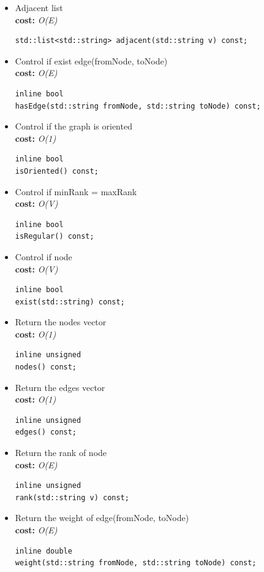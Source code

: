 \documentclass[10pt,a4paper]{article}
\begin{document}
\begin{itemize}
\item Adjacent list\\
\textbf{cost:} \emph{O(E)}
\begin{lstlisting}
std::list<std::string> adjacent(std::string v) const;
\end{lstlisting}

\item Control if exist edge(fromNode, toNode)\\
\textbf{cost:} \emph{O(E)}
\begin{lstlisting}
inline bool 
hasEdge(std::string fromNode, std::string toNode) const;
\end{lstlisting}

\item Control if the graph is oriented\\
\textbf{cost:} \emph{O(1)}
\begin{lstlisting}
inline bool 
isOriented() const;
\end{lstlisting}
   
\item Control if minRank = maxRank\\
\textbf{cost:} \emph{O(V)}
\begin{lstlisting}
inline bool 
isRegular() const; 
\end{lstlisting}
       
\item Control if node\\
\textbf{cost:} \emph{O(V)}
\begin{lstlisting}
inline bool 
exist(std::string) const;
\end{lstlisting} 
    
\item Return the nodes vector\\
\textbf{cost:} \emph{O(1)}
\begin{lstlisting}
inline unsigned 
nodes() const;
\end{lstlisting} 
  
\item Return the edges vector\\
\textbf{cost:} \emph{O(1)}
\begin{lstlisting}
inline unsigned 
edges() const;
\end{lstlisting}

\item Return the rank of node\\
\textbf{cost:} \emph{O(E)}
\begin{lstlisting}
inline unsigned 
rank(std::string v) const; 
\end{lstlisting}

\item Return the weight of edge(fromNode, toNode)\\
\textbf{cost:} \emph{O(E)}
\begin{lstlisting}
inline double   
weight(std::string fromNode, std::string toNode) const; 
\end{lstlisting}
\end{itemize}
\end{document}
